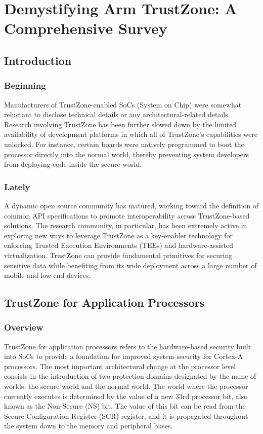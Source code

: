 \documentclass{article}
\begin{document}
\section{Demystifying Arm TrustZone: A Comprehensive Survey}

\subsection{Introduction}

\subsubsection{Beginning}

Manufacturers of TrustZone-enabled SoCs (System on Chip) were somewhat reluctant to disclose technical details or any architectural-related details. Research involving TrustZone has been further slowed down by the limited availability of development platforms in which all of TrustZone’s capabilities were unlocked. For instance, certain boards were natively programmed to boot the processor directly into the normal world, thereby preventing system developers from deploying code inside the secure world. 

\subsubsection{Lately}

A dynamic open source community has matured, working toward the definition of common API specifications to promote interoperability across TrustZone-based solutions. The research community, in particular, has been extremely active in exploring new ways to leverage TrustZone as a key-enabler technology for enforcing Trusted Execution Environments (TEEs) and hardware-assisted virtualization. TrustZone can provide fundamental primitives for securing sensitive data while benefiting from its wide deployment across a large number of mobile and low-end devices.

\subsection{TrustZone for Application Processors}

\subsubsection{Overview}

TrustZone for application processors refers to the hardware-based security built into SoCs to provide a foundation for improved system security for Cortex-A processors. The most important architectural change at the processor level consists in the introduction of two protection domains designated by the name of worlds: the secure world and the normal world. The world where the processor currently executes is determined by the value of a new 33rd processor bit, also known as the Non-Secure (NS) bit. The value of this bit can be read from the Secure Configuration Register (SCR) register, and it is propagated throughout the system down to the memory and peripheral buses.
\end{document}
